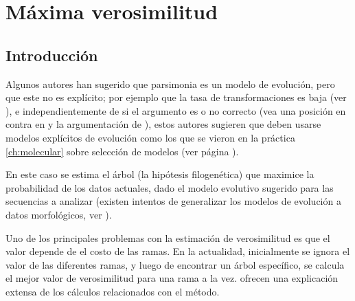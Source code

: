\chapter{M\'axima verosimilitud}
\section*{Introducci\'on}
\label{ch:likelihood}

Algunos autores han sugerido que parsimonia es un modelo de evoluci\'on, pero que este no es expl\'icito; por ejemplo que la tasa de transformaciones es baja (ver \cite{Swofford1996, Felsenstein2004}), e independientemente de si el argumento es o no correcto (vea una posici\'on en contra en \cite{Farris1983} y la argumentaci\'on de \cite{Steel2002}), estos autores sugieren que deben usarse modelos expl\'icitos de evoluci\'on como los que se vieron en la pr\'actica \ref{ch:molecular} sobre selecci\'on de modelos (ver p\'agina \pageref{ch:molecular}).

En este caso se estima el \'arbol (la hip\'otesis filogen\'etica) que maximice la probabilidad de los datos actuales, dado el modelo evolutivo sugerido para las secuencias a analizar (existen intentos de generalizar los modelos de evoluci\'on a datos morfol\'ogicos, ver \cite{Lewis2001}).

Uno de los principales problemas con la estimaci\'on de verosimilitud es que el valor depende de el costo de las ramas. En la actualidad, inicialmente se ignora el valor de las diferentes ramas, y luego de encontrar un \'arbol espec\'ifico, se calcula el mejor valor de verosimilitud para una rama a la vez. \cite{Swofford1996} ofrecen una explicaci\'on extensa de los c\'alculos relacionados con el m\'etodo.


